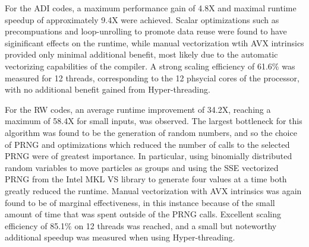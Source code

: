 \documentclass[letterpaper]{article}
\begin{document}
For the ADI codes, a maximum performance gain of 4.8X and maximal runtime speedup of approximately 9.4X were achieved. Scalar optimizations such as precompuations and loop-unrolling to promote data reuse were found to have siginificant effects on the runtime, while manual vectorization wtih AVX intrinsics provided only minimal additional benefit, most likely due to the automatic vectorizing capabilities of the compiler. A strong scaling efficiency of 61.6\% was measured for 12 threads, corresponding to the 12 phsycial cores of the processor, with no additional benefit gained from Hyper-threading.

For the RW codes, an average runtime improvement of 34.2X, reaching a maximum of 58.4X for small inputs, was observed. The largest bottleneck for this algorithm was found to be the generation of random numbers, and so the choice of PRNG and optimizations which reduced the number of calls to the selected PRNG were of greatest importance. In particular, using binomially distributed random variables to move particles as groups and using the SSE vectorized PRNG from the Intel MKL VS library to generate four values at a time both greatly reduced the runtime. Manual vectorization with AVX intrinsics was again found to be of marginal effectiveness, in this instance because of the small amount of time that was spent outside of the PRNG calls. Excellent scaling efficiency of 85.1\% on 12 threads was reached, and a small but noteworthy additional speedup was measured when using Hyper-threading.

\end{document}
